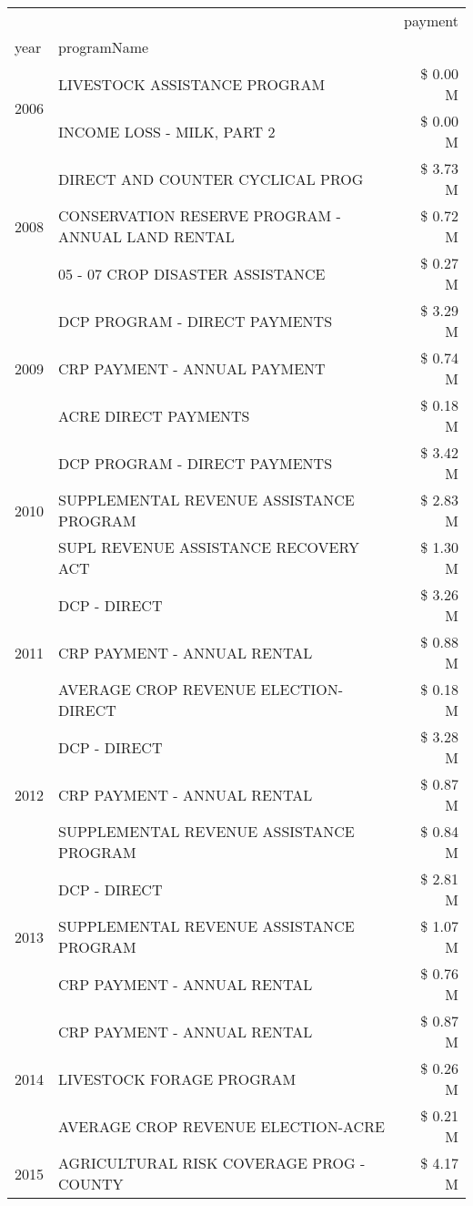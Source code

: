 \begin{tabular}{llr}
\toprule
 &  & payment \\
year & programName &  \\
\midrule
\multirow[t]{2}{*}{2006} & LIVESTOCK ASSISTANCE PROGRAM & \$ 0.00 M \\
 & INCOME LOSS - MILK, PART 2 & \$ 0.00 M \\
\cline{1-3}
\multirow[t]{3}{*}{2008} & DIRECT AND COUNTER CYCLICAL PROG & \$ 3.73 M \\
 & CONSERVATION RESERVE PROGRAM - ANNUAL LAND RENTAL & \$ 0.72 M \\
 & 05 - 07 CROP DISASTER ASSISTANCE & \$ 0.27 M \\
\cline{1-3}
\multirow[t]{3}{*}{2009} & DCP PROGRAM - DIRECT PAYMENTS & \$ 3.29 M \\
 & CRP PAYMENT - ANNUAL PAYMENT & \$ 0.74 M \\
 & ACRE DIRECT PAYMENTS & \$ 0.18 M \\
\cline{1-3}
\multirow[t]{3}{*}{2010} & DCP PROGRAM - DIRECT PAYMENTS & \$ 3.42 M \\
 & SUPPLEMENTAL REVENUE ASSISTANCE PROGRAM & \$ 2.83 M \\
 & SUPL REVENUE ASSISTANCE RECOVERY ACT & \$ 1.30 M \\
\cline{1-3}
\multirow[t]{3}{*}{2011} & DCP - DIRECT & \$ 3.26 M \\
 & CRP PAYMENT - ANNUAL RENTAL & \$ 0.88 M \\
 & AVERAGE CROP REVENUE ELECTION-DIRECT & \$ 0.18 M \\
\cline{1-3}
\multirow[t]{3}{*}{2012} & DCP - DIRECT & \$ 3.28 M \\
 & CRP PAYMENT - ANNUAL RENTAL & \$ 0.87 M \\
 & SUPPLEMENTAL REVENUE ASSISTANCE PROGRAM & \$ 0.84 M \\
\cline{1-3}
\multirow[t]{3}{*}{2013} & DCP - DIRECT & \$ 2.81 M \\
 & SUPPLEMENTAL REVENUE ASSISTANCE PROGRAM & \$ 1.07 M \\
 & CRP PAYMENT - ANNUAL RENTAL & \$ 0.76 M \\
\cline{1-3}
\multirow[t]{3}{*}{2014} & CRP PAYMENT - ANNUAL RENTAL & \$ 0.87 M \\
 & LIVESTOCK FORAGE PROGRAM & \$ 0.26 M \\
 & AVERAGE CROP REVENUE ELECTION-ACRE & \$ 0.21 M \\
\cline{1-3}
\multirow[t]{3}{*}{2015} & AGRICULTURAL RISK COVERAGE PROG - COUNTY & \$ 4.17 M \\

\end{tabular}
